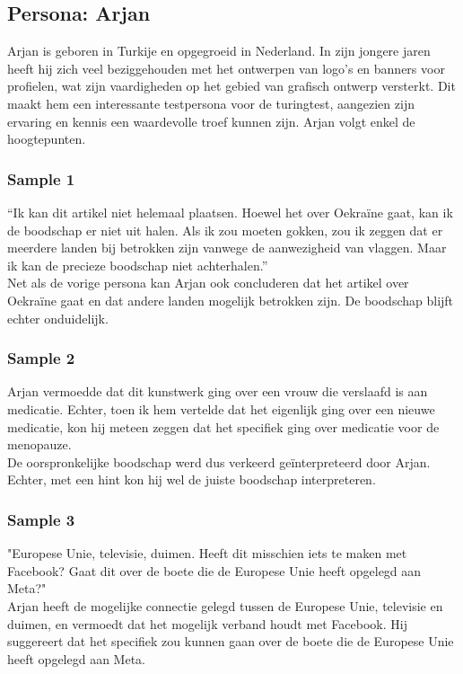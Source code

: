 \subsection{Persona: Arjan}
Arjan is geboren in Turkije en opgegroeid in Nederland. In zijn jongere jaren heeft hij zich veel beziggehouden met het ontwerpen van logo's en banners voor profielen, wat zijn vaardigheden op het gebied van grafisch ontwerp versterkt. Dit maakt hem een interessante testpersona voor de turingtest, aangezien zijn ervaring en kennis een waardevolle troef kunnen zijn. Arjan volgt enkel de hoogtepunten.

\subsubsection{Sample 1}
``Ik kan dit artikel niet helemaal plaatsen. Hoewel het over Oekraïne gaat, kan ik de boodschap er niet uit halen. Als ik zou moeten gokken, zou ik zeggen dat er meerdere landen bij betrokken zijn vanwege de aanwezigheid van vlaggen. Maar ik kan de precieze boodschap niet achterhalen.'' \\

Net als de vorige persona kan Arjan ook concluderen dat het artikel over Oekraïne gaat en dat andere landen mogelijk betrokken zijn. De boodschap blijft echter onduidelijk.

\subsubsection{Sample 2}
Arjan vermoedde dat dit kunstwerk ging over een vrouw die verslaafd is aan medicatie. Echter, toen ik hem vertelde dat het eigenlijk ging over een nieuwe medicatie, kon hij meteen zeggen dat het specifiek ging over medicatie voor de menopauze. \\

De oorspronkelijke boodschap werd dus verkeerd geïnterpreteerd door Arjan. Echter, met een hint kon hij wel de juiste boodschap interpreteren.

\subsubsection{Sample 3}
"Europese Unie, televisie, duimen. Heeft dit misschien iets te maken met Facebook? Gaat dit over de boete die de Europese Unie heeft opgelegd aan Meta?" \\

Arjan heeft de mogelijke connectie gelegd tussen de Europese Unie, televisie en duimen, en vermoedt dat het mogelijk verband houdt met Facebook. Hij suggereert dat het specifiek zou kunnen gaan over de boete die de Europese Unie heeft opgelegd aan Meta. \\

